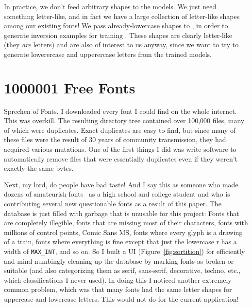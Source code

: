 \documentclass[twocolumn]{article}
\begin{document}
In practice, we don't feed arbitrary shapes to the models. We just
need something letter-like, and in fact we have a large collection of
letter-like shapes among our existing fonts! We pass already-lowercase
shapes to \makelowercase, in order to generate inversion examples for
training \makeuppercase. These shapes are clearly letter-like (they
{\em are} letters) and are also of interest to us anyway, since we
want to try to generate lowerercase and upperercase letters from
the trained models.


\section{1000001 Free Fonts}


Sprechen of Fonts, I downloaded every font I could find on the whole
internet. This was overkill. The resulting directory tree contained
over 100,000 files, many of which were duplicates. Exact duplicates
are easy to find, but since many of these files were the result of 30
years of community transmission, they had acquired various mutations.
One of the first things I did was write software to automatically
remove files that were essentially duplicates even if they weren't
exactly the same bytes.

Next, my lord, do people have bad taste! And I say this as someone who
made dozens of amateurish fonts~\cite{dbzfonts} as a high school and
college student and who is contributing several new questionable
fonts\label{sec:newfonts} as a result of this paper. The database is
just filled with garbage that is unusable for this project: Fonts that
are completely illegible, fonts that are missing most of their
characters, fonts with millions of control points, Comic Sans MS,
fonts where every glyph is a drawing of a train, fonts where
everything is fine except that just the lowercase r has a width of
{\tt MAX\_INT}, and so on. So I built a UI
(Figure~\ref{fig:sortition}) for efficiently and mind-numbingly
cleaning up the database by marking fonts as broken or suitable (and
also categorizing them as serif, sans-serif, decorative, techno, etc.,
which classifications I never used). In doing this I noticed another
extremely common problem, which was that many fonts had the same
letter shapes for uppercase and lowercase letters. This would not do
for the current application!
\end{document}
